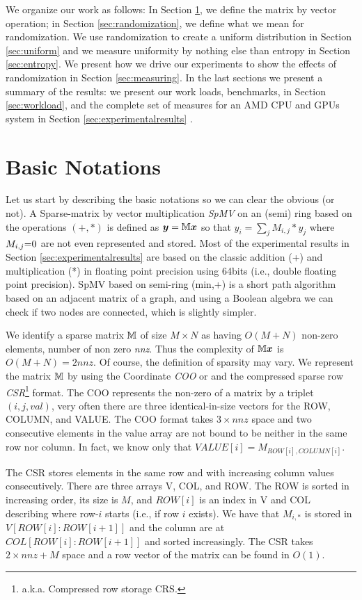 \documentclass[manuscript,screen]{acmart}
\begin{document}
We organize our work as follows: In Section \ref{sec:notations}, we
define the matrix by vector operation; in Section
\ref{sec:randomization}, we define what we mean for randomization. We
use randomization to create a uniform distribution in Section
\ref{sec:uniform} and we measure uniformity by nothing else than
entropy in Section \ref{sec:entropy}. We present how we drive our
experiments to show the effects of randomization in Section
\ref{sec:measuring}. In the last sections we present a summary of the
results: we present our work loads, benchmarks, in Section
\ref{sec:workload}, and the complete set of measures for an AMD CPU
and GPUs system in Section \ref{sec:experimentalresults} .

\section{Basic Notations}
\label{sec:notations}
Let us start by describing the basic notations so we can clear the
obvious (or not).  A Sparse-matrix by vector multiplication {\em SpMV}
on an (semi) ring based on the operations $(+,*)$ is defined as
${\boldsymbol y} = \mathbb{M} {\boldsymbol x}$ so that $y_i = \sum_j M_{i,j}*y_j$ where $M_{i,j}
{=} 0$ are not even represented and stored. Most of the experimental
results in Section \ref{sec:experimentalresults} are based on the
classic addition (+) and multiplication (*) in floating point
precision using 64bits (i.e., double floating point precision).  SpMV
based on semi-ring (min,+) is a short path algorithm based on an
adjacent matrix of a graph, and using a Boolean algebra we can check
if two nodes are connected, which is slightly simpler.

We identify a sparse matrix $\mathbb{M}$ of size $M\times N$ as having
$O(M+N)$ non-zero elements, number of non zero {\em nnz}. Thus the
complexity of $\mathbb{M} {\boldsymbol x}$ is $O(M+N) = 2nnz$. Of course, the
definition of sparsity may vary. We represent the matrix $\mathbb{M}$ by using
the Coordinate {\em COO} or and the compressed sparse row {\em
  CSR}\footnote{a.k.a. Compressed row storage {\rm CRS}.}  format. The
COO represents the non-zero of a matrix by a triplet $(i,j,val)$, very
often there are three identical-in-size vectors for the ROW, COLUMN,
and VALUE. The COO format takes $3\times nnz$ space and two
consecutive elements in the value array are not bound to be neither in
the same row nor column. In fact, we know only that $VALUE[i] =
M_{ROW[i],COLUMN[i]}$.

The CSR stores elements in the same row and with increasing column
values consecutively. There are three arrays V, COL, and ROW. The ROW
is sorted in increasing order, its size is $M$, and $ROW[i]$ is an
index in V and COL describing where row-$i$ starts (i.e., if row $i$
exists).  We have that $M_{i,*}$ is stored in $V[ROW[i]:ROW[i+1]]$ and
the column are at $COL[ROW[i]:ROW[i+1]]$ and sorted increasingly. The
CSR takes $2\times nnz + M$ space and a row vector of the matrix can
be found in $O(1)$.
 
\end{document}
